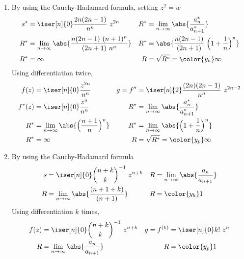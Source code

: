 \begin{enumerate}
    \item By using the Cauchy-Hadamard formula, setting $ z^2 = w $
          \begin{align}
              s^*                      & = \iser[n]{0} \frac{2n(2n-1)}{n^n}\ z^{2n} &
              R^*                      & = \lim_{n \to \infty} \abs{\frac{a^*_n}
              {a^*_{n+1}}}                                                            \\
              R^*                      & = \lim_{n \to \infty} \abs{\frac{n(2n-1)
              \ (n+1)^n}{(2n+1)\ n^n}} &
              R^*                      & = \abs{\frac{n(2n-1)}{(2n+1)}
              \ \Big(1 + \frac{1}{n} \Big)^n}                                         \\
              R^*                      & = \infty                                   &
              R                        & = \sqrt{R^*} = \color{y_h} \infty
          \end{align}
          Using differentiation twice,
          \begin{align}
              f(z)    & = \iser[n]{0} \frac{z^{2n}}{n^n}                          &
              g = f'' & = \iser[n]{2} \frac{(2n)(2n-1)}{n^n}\ z^{2n-2}              \\
              f^*(z)  & = \iser[n]{0} \frac{z^n}{n^n}                             &
              R^*     & = \lim_{n \to \infty} \abs{\frac{a^*_n}
              {a^*_{n+1}}}                                                          \\
              R^*     & = \lim_{n \to \infty} \abs{\Big( \frac{n+1}{n} \Big)^n}   &
              R^*     & = \lim_{n \to \infty} \abs{\Big( 1 + \frac{1}{n} \Big)^n}   \\
              R^*     & = \infty                                                  &
              R       & = \sqrt{R^*} = \color{y_p} \infty
          \end{align}

    \item By using the Cauchy-Hadamard formula
          \begin{align}
              s        & = \iser[n]{0} \binom{n+k}{k}^{-1}\ z^{n+k} &
              R        & = \lim_{n \to \infty} \abs{\frac{a_n}
              {a_{n+1}}}                                              \\
              R        & = \lim_{n \to \infty} \abs{\frac{(n+1+k)}
              {(n+1)}} &
              R        & = \color{y_h} 1
          \end{align}
          Using differentiation $k$ times,
          \begin{align}
              f(z)        & = \iser[n]{0} \binom{n+k}{k}^{-1}\ z^{n+k}      &
              g = f^{(k)} & = \iser[n]{0} k!\ z^n                             \\
              R           & = \lim_{n \to \infty} \abs{\frac{a_n}{a_{n+1}}} &
              R           & = \color{y_p} 1
          \end{align}


\end{enumerate}
